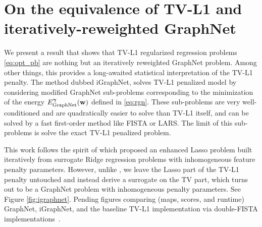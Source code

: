 \chapter{On the equivalence of TV-L1 and iteratively-reweighted
  GraphNet}\label{chap:igraphnet}

\minitoc

We present a result that shows that TV-L1 regularized regression problems \eqref{eq:opt_pb} are nothing but an iteratively reweighted GraphNet problem. Among other things, this provides a long-awaited statistical interpretation of the TV-L1 penalty. The method dubbed iGraphNet, solves TV-L1 penalized model by considering modified GraphNet sub-problems corresponding to the minimization of the energy
$E_{\text{GraphNet}}^{\boldsymbol{\gamma}}(\mathbf{w})$ defined in \eqref{eq:rgn}. These sub-problems  are very well-conditioned and are quadratically easier to solve than TV-L1 itself, and can be solved by
a fast first-order method like FISTA or LARS. The limit of this sub-problems is solve the exact TV-L1 penalized problem.

This work follows the spirit of \citep{candes2007enhancing} which proposed an enhanced Lasso problem built iteratively from surrogate Ridge regression problems with inhomogeneous feature penalty parameters. However, unlike \citep{candes2007enhancing}, we leave the Lasso part of the TV-L1 penalty untouched and instead derive a surrogate on the TV part, which turns out to be a GraphNet problem with inhomogeneous penalty parameters.
See Figure \ref{fig:igraphnet}. Pending figures comparing (maps, scores, and
runtime) GraphNet, iGraphNet, and the baseline TV-L1 implementation via double-FISTA implementations~\citep{dohmatob2014benchmarking,varoquaux2015faasta}.

